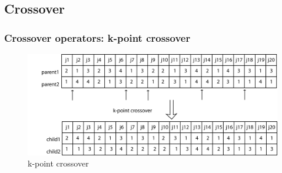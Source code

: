 \documentclass{beamer}
\begin{document}
\subsection*{Crossover}
\begin{frame}
\frametitle{Crossover operators: k-point crossover}
\begin{figure}[!h]
    \includegraphics[width=\textwidth]{imgs/crossover2}
    \caption{k-point crossover}
\end{figure}
\end{frame}
\end{document}
